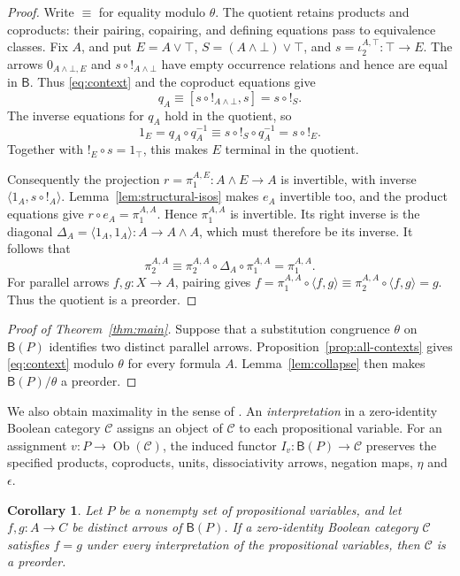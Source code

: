 \documentclass[11pt]{article}
\newtheorem{corollary}[theorem]{Corollary}
\newcommand{\B}{\mathsf B}
\begin{document}
\begin{proof}
Write $\equiv$ for equality modulo $\theta$.
The quotient retains products and coproducts: their pairing,
copairing, and defining equations pass to equivalence classes.
Fix $A$, and put
$E=A\vee\top$, $S=(A\wedge\bot)\vee\top$, and
$s=\iota_2^{A,\top}:\top\to E$.
The arrows $0_{A\wedge\bot,E}$ and $s\circ!_{A\wedge\bot}$ have
empty occurrence relations and hence are equal in $\B$. Thus
\eqref{eq:context} and the coproduct equations give
\[
 q_A\equiv[s\circ!_{A\wedge\bot},s]=s\circ!_S.
\]
The inverse equations for $q_A$ hold in the quotient, so
\[
 1_E=q_A\circ q_A^{-1}
    \equiv s\circ!_S\circ q_A^{-1}=s\circ!_E.
\]
Together with $!_E\circ s=1_\top$, this makes $E$ terminal in the
quotient.

Consequently the projection
$r=\pi_1^{A,E}:A\wedge E\to A$ is invertible, with inverse
$\langle1_A,s\circ!_A\rangle$.
Lemma~\ref{lem:structural-isos} makes $e_A$ invertible too, and the
product equations give
$r\circ e_A=\pi_1^{A,A}$.
Hence $\pi_1^{A,A}$ is invertible. Its right inverse is the diagonal
$\Delta_A=\langle1_A,1_A\rangle:A\to A\wedge A$, which must
therefore be its inverse. It follows that
\[
 \pi_2^{A,A}
   \equiv\pi_2^{A,A}\circ\Delta_A\circ\pi_1^{A,A}
   =\pi_1^{A,A}.
\]
For parallel arrows $f,g:X\to A$, pairing gives
$f=\pi_1^{A,A}\circ\langle f,g\rangle
 \equiv\pi_2^{A,A}\circ\langle f,g\rangle=g$.
Thus the quotient is a preorder.
\end{proof}

\begin{proof}[Proof of Theorem~\ref{thm:main}]
Suppose that a substitution congruence $\theta$ on $\B(P)$ identifies
two distinct parallel arrows. Proposition~\ref{prop:all-contexts}
gives \eqref{eq:context} modulo $\theta$ for every formula $A$.
Lemma~\ref{lem:collapse} then makes $\B(P)/\theta$ a preorder.
\end{proof}

We also obtain maximality in the sense of
\cite[\S9.3, p.~194]{DP}. An \emph{interpretation} in a zero-identity
Boolean category $\mathcal C$ assigns an object of $\mathcal C$ to
each propositional variable. For an assignment
$v:P\to\operatorname{Ob}(\mathcal C)$, the induced functor
$I_v:\B(P)\to\mathcal C$ preserves the specified products, coproducts,
units, dissociativity arrows, negation maps, $\eta$ and $\epsilon$.

\begin{corollary}\label{cor:models}
Let $P$ be a nonempty set of propositional variables, and let
$f,g:A\to C$ be distinct arrows of $\B(P)$.
If a zero-identity Boolean category $\mathcal C$ satisfies $f=g$
under every interpretation of the propositional variables, then
$\mathcal C$ is a preorder.
\end{corollary}
\end{document}
